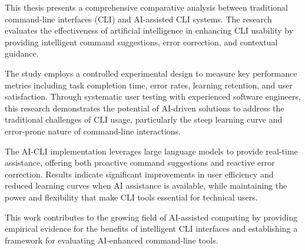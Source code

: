 This thesis presents a comprehensive comparative analysis between traditional command-line interfaces (CLI) and AI-assisted CLI systems. The research evaluates the effectiveness of artificial intelligence in enhancing CLI usability by providing intelligent command suggestions, error correction, and contextual guidance.

The study employs a controlled experimental design to measure key performance metrics including task completion time, error rates, learning retention, and user satisfaction. Through systematic user testing with experienced software engineers, this research demonstrates the potential of AI-driven solutions to address the traditional challenges of CLI usage, particularly the steep learning curve and error-prone nature of command-line interactions.

The AI-CLI implementation leverages large language models to provide real-time assistance, offering both proactive command suggestions and reactive error correction. Results indicate significant improvements in user efficiency and reduced learning curves when AI assistance is available, while maintaining the power and flexibility that make CLI tools essential for technical users.

This work contributes to the growing field of AI-assisted computing by providing empirical evidence for the benefits of intelligent CLI interfaces and establishing a framework for evaluating AI-enhanced command-line tools.
